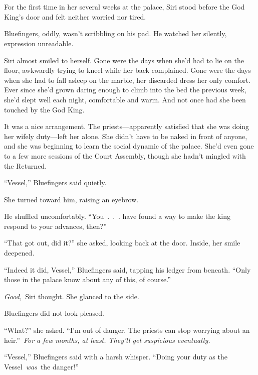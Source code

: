 \chapter{}

For the first time in her several weeks at the palace, Siri stood before the God King’s door and felt neither worried nor tired.

Bluefingers, oddly, wasn’t scribbling on his pad. He watched her silently, expression unreadable.

Siri almost smiled to herself. Gone were the days when she’d had to lie on the floor, awkwardly trying to kneel while her back complained. Gone were the days when she had to fall asleep on the marble, her discarded dress her only comfort. Ever since she’d grown daring enough to climb into the bed the previous week, she’d slept well each night, comfortable and warm. And not once had she been touched by the God King.

It was a nice arrangement. The priests—apparently satisfied that she was doing her wifely duty—left her alone. She didn’t have to be naked in front of anyone, and she was beginning to learn the social dynamic of the palace. She’d even gone to a few more sessions of the Court Assembly, though she hadn’t mingled with the Returned.

“Vessel,” Bluefingers said quietly.

She turned toward him, raising an eyebrow.

He shuffled uncomfortably. “You~.~.~. have found a way to make the king respond to your advances, then?”

“That got out, did it?” she asked, looking back at the door. Inside, her smile deepened.

“Indeed it did, Vessel,” Bluefingers said, tapping his ledger from beneath. “Only those in the palace know about any of this, of course.”

\textit{Good,}~Siri thought. She glanced to the side.

Bluefingers did not look pleased.

“What?” she asked. “I’m out of danger. The priests can stop worrying about an heir.”~\textit{For a few months, at least. They’ll get suspicious eventually.}

“Vessel,” Bluefingers said with a harsh whisper. “Doing your duty as the Vessel~\textit{was}~the danger!”

